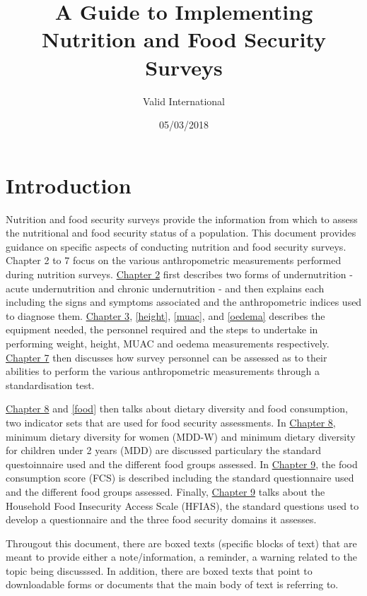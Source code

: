 \documentclass[12pt,]{book}
\title{A Guide to Implementing Nutrition and Food Security Surveys}
\author{Valid International}
\date{05/03/2018}
\theoremstyle{definition}
\theoremstyle{definition}
\theoremstyle{definition}
\theoremstyle{remark}
\begin{document}
\maketitle

{
\setcounter{tocdepth}{1}
\tableofcontents
}
\hypertarget{introduction}{%
\chapter{Introduction}\label{introduction}}

Nutrition and food security surveys provide the information from which
to assess the nutritional and food security status of a population. This
document provides guidance on specific aspects of conducting nutrition
and food security surveys. Chapter 2 to 7 focus on the various
anthropometric measurements performed during nutrition surveys.
\protect\hyperlink{anthro}{Chapter 2} first describes two forms of
undernutrition - acute undernutrition and chronic undernutrition - and
then explains each including the signs and symptoms associated and the
anthropometric indices used to diagnose them.
\protect\hyperlink{weight}{Chapter 3}, \ref{height}, \ref{muac}, and
\ref{oedema} describes the equipment needed, the personnel required and
the steps to undertake in performing weight, height, MUAC and oedema
measurements respectively. \protect\hyperlink{standard}{Chapter 7} then
discusses how survey personnel can be assessed as to their abilities to
perform the various anthropometric measurements through a
standardisation test.

\protect\hyperlink{diet}{Chapter 8} and \ref{food} then talks about
dietary diversity and food consumption, two indicator sets that are used
for food security assessments. In \protect\hyperlink{diet}{Chapter 8},
minimum dietary diversity for women (MDD-W) and minimum dietary
diversity for children under 2 years (MDD) are discussed particulary the
standard questoinnaire used and the different food groups assessed. In
\protect\hyperlink{food}{Chapter 9}, the food consumption score (FCS) is
described including the standard questionnaire used and the different
food groups assessed. Finally, \protect\hyperlink{hfias}{Chapter 9}
talks about the Household Food Insecurity Access Scale (HFIAS), the
standard questions used to develop a questionnaire and the three food
security domains it assesses.

Througout this document, there are boxed texts (specific blocks of text)
that are meant to provide either a note/information, a reminder, a
warning related to the topic being discusssed. In addition, there are
boxed texts that point to downloadable forms or documents that the main
body of text is referring to.
\end{document}
